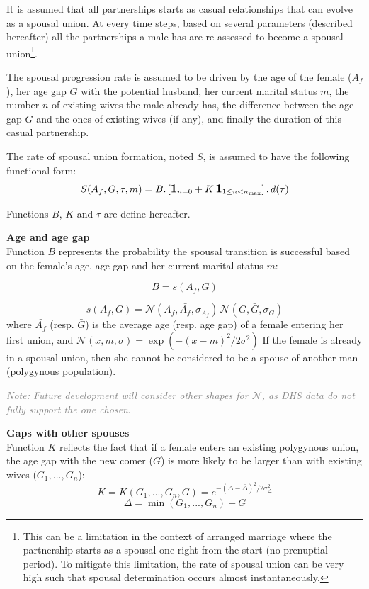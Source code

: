 \documentclass[11pt, onecolumn]{article}
\newcommand{\one}[1]{\textbf{\large{1}}_{#1}}
\newcommand{\note}[1]{\textit{\textcolor{Grey}{Note: #1}}}
\begin{document}
It is assumed that all partnerships starts as casual relationships that can evolve as a spousal union. At every time steps, based on several parameters (described hereafter) all the partnerships a male has are re-assessed to become a spousal union\footnote{This can be a limitation in the context of arranged marriage where the partnership starts as a spousal one right from the start (no prenuptial period). To mitigate this limitation, the rate of spousal union can be very high such that spousal determination occurs almost instantaneously.}.

The spousal progression rate is assumed to be driven by the age of the female ($A_f$), her age gap $G$ with the potential husband, her current marital status $m$, the number $n$ of existing wives the male already has, the difference between the age gap $G$ and the ones of existing wives (if any), and finally the duration of this casual partnership.

The rate of spousal union formation, noted $S$, is assumed to have the following functional form:
\begin{equation}
\label{eqSpouse}
S(A_f,G,\tau,m) = B . \left[\one{n=0} +  K\,\one{1\leq n <n_{\mathrm{max}}} \right] .\, d(\tau)
\end{equation}

Functions $B$, $K$ and $\tau$ are define hereafter.

\textbf{Age and age gap}\\
Function $B$ represents the probability the spousal transition is successful based on the female's age, age gap and her current marital status $m$:

$$B = s(A_f,G)$$

$$ s(A_f,G) = \mathcal{N}(A_f,\bar{A_f},\sigma_{A_f})\, \mathcal{N}(G,\bar{G},\sigma_{G}) $$
where $\bar{A_f}$ (resp. $\bar{G}$) is the average age (resp. age gap) of a female entering her first union,  and $\mathcal{N}(x,m,\sigma)=\exp(-(x-m)^2/2\sigma^2)$ 
 If the female is already in a spousal union, then she cannot be considered to be a spouse of another man (polygynous population).

\note{Future development will consider other shapes for $\mathcal{N}$, as DHS data do not fully support the one chosen}.


\textbf{Gaps with other spouses}\\
Function $K$ reflects the fact that if a female enters an existing polygynous union, the age gap with the new comer ($G$) is more likely to be larger than with existing wives ($G_1,...,G_n$):
$$K = K(G_{1},...,G_{n},G) = e^{-(\Delta-\bar{\Delta})^2/2\sigma_\Delta^2}$$ 
$$\Delta = \min(G_1,...,G_n)-G$$
\end{document}
